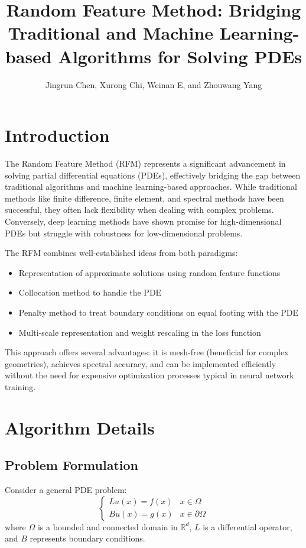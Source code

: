 \documentclass[11pt]{article}
\title{Random Feature Method: Bridging Traditional and Machine Learning-based Algorithms for Solving PDEs}
\author{Jingrun Chen, Xurong Chi, Weinan E, and Zhouwang Yang}
\date{}
\begin{document}
\maketitle

\section{Introduction}
The Random Feature Method (RFM) represents a significant advancement in solving partial differential equations (PDEs), effectively bridging the gap between traditional algorithms and machine learning-based approaches. While traditional methods like finite difference, finite element, and spectral methods have been successful, they often lack flexibility when dealing with complex problems. Conversely, deep learning methods have shown promise for high-dimensional PDEs but struggle with robustness for low-dimensional problems.

The RFM combines well-established ideas from both paradigms:
\begin{itemize}
    \item Representation of approximate solutions using random feature functions
    \item Collocation method to handle the PDE
    \item Penalty method to treat boundary conditions on equal footing with the PDE
    \item Multi-scale representation and weight rescaling in the loss function
\end{itemize}

This approach offers several advantages: it is mesh-free (beneficial for complex geometries), achieves spectral accuracy, and can be implemented efficiently without the need for expensive optimization processes typical in neural network training.

\section{Algorithm Details}

\subsection{Problem Formulation}
Consider a general PDE problem:
\begin{equation}
\begin{cases}
Lu(x) = f(x) & x \in \Omega \\
Bu(x) = g(x) & x \in \partial\Omega
\end{cases}
\end{equation}
where $\Omega$ is a bounded and connected domain in $\mathbb{R}^d$, $L$ is a differential operator, and $B$ represents boundary conditions.
\end{document}
